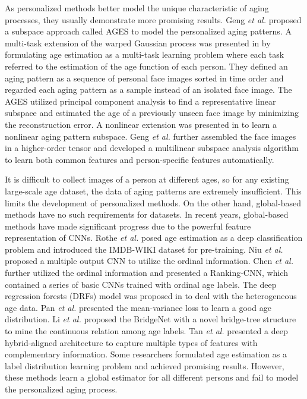 \documentclass[journal,twoside]{IEEEtran}
\begin{document}
As personalized methods better model the unique characteristic of aging processes, they usually demonstrate more promising results. Geng \emph{et al.} \cite{geng2006learning,geng2007automatic} proposed a subspace approach called AGES to model the personalized aging patterns.
A multi-task extension of the warped Gaussian process was presented in \cite{zhang2010multi} by formulating age estimation as a multi-task learning problem where each task referred to the estimation of the age function of each person.
They defined an aging pattern as a sequence of personal face images sorted in time order and regarded each aging pattern as a sample instead of an isolated face image. The AGES utilized principal component analysis to find a representative linear subspace and estimated the age of a previously unseen face image by minimizing the reconstruction error.
A nonlinear extension was presented in \cite{geng2008facial} to learn a nonlinear aging pattern subspace. Geng \emph{et al.} \cite{geng2009facial} further assembled the face images in a higher-order tensor and developed a multilinear subspace analysis algorithm to learn both common features and person-specific  features automatically.

It is difficult to collect images of a person at different ages, so for any existing large-scale age dataset, the data of aging patterns are extremely insufficient. This limits the development of personalized methods. 
On the other hand, global-based methods have no such requirements for datasets. In recent years,  global-based methods have made significant  progress \cite{niu2016ordinal,shen2018deep,pan2018mean,shen2017label} due to the powerful feature representation of CNNs. Rothe \emph{et al.} \cite{rothe2018deep} posed age estimation as a deep classification problem and introduced the IMDB-WIKI dataset for pre-training. Niu \emph{et al.} \cite{niu2016ordinal} proposed a multiple output CNN to utilize the ordinal information. Chen \emph{et al.} \cite{chen2017using} further utilized the ordinal information and presented a Ranking-CNN, which contained a series of basic CNNs trained with ordinal age labels. The deep regression forests (DRFs) model was proposed in \cite{shen2018deep} to deal with  the heterogeneous age data. Pan \emph{et al.} \cite{pan2018mean} presented the mean-variance loss to learn a good age distribution. Li \emph{et al.} \cite{li2019bridgenet} proposed the BridgeNet with a novel bridge-tree structure to mine the continuous relation among age labels. Tan \emph{et al.} \cite{tan2019deeply} presented a deep hybrid-aligned architecture to capture multiple types of features with complementary information. Some researchers formulated age estimation as a label distribution learning problem \cite{gao2017deep,shen2017label} and achieved promising results. However, these methods learn a global estimator for all different persons and fail to model the personalized aging process.
\end{document}
